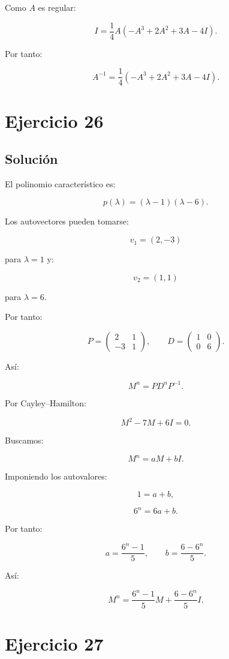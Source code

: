\documentclass[11pt,a4paper]{article}
\begin{document}
Como $A$ es regular:

\[
I
=
\frac14
A(-A^3+2A^2+3A-4I).
\]

Por tanto:

\[
\boxed{
A^{-1}
=
\frac14
\left(
-A^3+2A^2+3A-4I
\right).
}
\]

\section{Ejercicio 26}
\subsection{Solución}

El polinomio característico es:

\[
p(\lambda)
=
(\lambda-1)(\lambda-6).
\]

Los autovectores pueden tomarse:

\[
v_1=(2,-3)
\]

para $\lambda=1$ y:

\[
v_2=(1,1)
\]

para $\lambda=6$.

Por tanto:

\[
P=
\begin{pmatrix}
2&1\\
-3&1
\end{pmatrix},
\qquad
D=
\begin{pmatrix}
1&0\\
0&6
\end{pmatrix}.
\]

Así:

\[
\boxed{
M^n
=
PD^nP^{-1}.
}
\]

Por Cayley--Hamilton:

\[
M^2-7M+6I=0.
\]

Buscamos:

\[
M^n=aM+bI.
\]

Imponiendo los autovalores:

\[
1=a+b,
\]

\[
6^n=6a+b.
\]

Por tanto:

\[
a=\frac{6^n-1}{5},
\qquad
b=\frac{6-6^n}{5}.
\]

Así:

\[
\boxed{
M^n
=
\frac{6^n-1}{5}M
+
\frac{6-6^n}{5}I.
}
\]

\section{Ejercicio 27}
\end{document}
